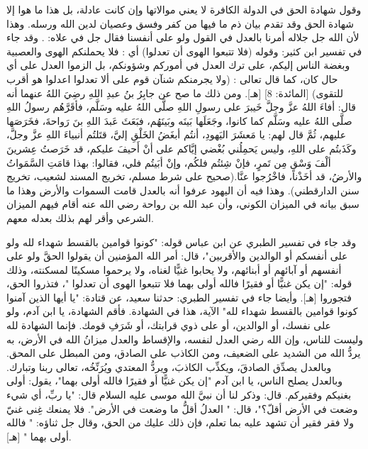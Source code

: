 وقول شهادة الحق في الدولة الكافرة لا يعني موالاتها وإن كانت عادلة، بل هذا ما هوا إلا شهادة الحق وقد تقدم بيان ذم ما فيها من كفر وفسق وعصيان لدين الله ورسله. وهذا لأن الله جل جلاله أمرنا بالعدل في القول ولو على أنفسنا فقال جل في علاه:
\quranayah*[4][135]{\footnotesize \surahname*[4]}. وقد جاء في تفسير ابن كثير: وقوله (فلا تتبعوا الهوى أن تعدلوا) أي : فلا يحملنكم الهوى والعصبية وبغضة الناس إليكم، على ترك العدل في أموركم وشؤونكم، بل الزموا العدل على أي حال كان، كما قال تعالى : (ولا يجرمنكم شنآن قوم على ألا تعدلوا اعدلوا هو أقرب للتقوى) [المائدة: 8] [هـ]. ومن ذلك ما صح عن جابِرُ بنُ عبدِ اللهِ رضِيَ اللهُ عنهما أنه قال: أفاءَ اللهُ عزَّ وجلَّ خَيبرَ على رسولِ اللهِ صلَّى اللهُ عليه وسَلَّم، فأقَرَّهُم رسولُ اللهِ صلَّى اللهُ عليه وسَلَّم كما كانوا، وجَعَلَها بَينَه وبَينَهُم، فبَعَثَ عَبدَ اللهِ بنَ رَواحةَ، فخَرَصَها عليهم، ثُمَّ قال لهم: يا مَعشَرَ اليَهودِ، أنتُم أبغَضُ الخَلْقِ إليَّ، قتَلتُم أنبياءَ اللهِ عزَّ وجلَّ، وكَذَبتُم على اللهِ، وليس يَحمِلُني بُغْضي إيَّاكم على أنْ أَحيفَ عليكم، قد خَرَصتُ عِشرينَ ألْفَ وَسْقٍ مِن تَمرٍ، فإنْ شِئتُم فلكُم، وإنْ أبَيتُم فلي، فقالوا: بهذا قامَتِ السَّمَواتُ والأرضُ، قد أخَذْنا، فاخْرُجوا عنَّا.{\footnotesize (صحيح على شرط مسلم، تخريج المسند لشعيب، تخريج سنن الدارقطني)}. وهذا فيه أن اليهود عرفوا أنه بالعدل قامت السموات والأرض وهذا ما سبق بيانه في الميزان الكوني، وأن عبد الله بن رواحة رضي الله عنه أقام فيهم الميزان الشرعي وأقر لهم بذلك بعدله معهم. 

وقد جاء في تفسير الطبري عن ابن عباس قوله: "كونوا قوامين بالقسط شهداء لله ولو على أنفسكم أو الوالدين والأقربين"، قال: أمر الله المؤمنين أن يقولوا الحقَّ ولو على أنفسهم أو آبائهم أو أبنائهم، ولا يحابوا غنيًّا لغناه، ولا يرحموا مسكينًا لمسكنته، وذلك قوله: "إن يكن غنيًّا أو فقيرًا فالله أولى بهما فلا تتبعوا الهوى أن تعدلوا "، فتذروا الحق، فتجوروا [هـ]. وأيضا جاء في تفسير الطبري: حدثنا سعيد، عن قتادة: "يا أيها الذين آمنوا كونوا قوامين بالقسط شهداء لله" الآية، هذا في الشهادة. فأقم الشهادة، يا ابن آدم، ولو على نفسك، أو الوالدين، أو على ذوي قرابتك، أو شَرَفِ قومك. فإنما الشهادة لله وليست للناس، وإن الله رضي العدل لنفسه، والإقساط والعدل ميزانُ الله في الأرض، به يردُّ الله من الشديد على الضعيف، ومن الكاذب على الصادق، ومن المبطل على المحق. وبالعدل يصدِّق الصادقَ، ويكذِّب الكاذبَ، ويردُّ المعتدي ويُرَنِّخُه، تعالى ربنا وتبارك. وبالعدل يصلح الناس، يا ابن آدم "إن يكن غنيًّا أو فقيرًا فالله أولى بهما"، يقول: أولى بغنيكم وفقيركم. قال: وذكر لنا أن نبيَّ الله موسى عليه السلام قال: "يا ربِّ، أي شيء وضعت في الأرض أقلّ؟"، قال: " العدلُ أقلُّ ما وضعت في الأرض". فلا يمنعك غِنى غنيّ ولا فقر فقير أن تشهد عليه بما تعلم، فإن ذلك عليك من الحق، وقال جل ثناؤه: " فالله أولى بهما " [هـ].



